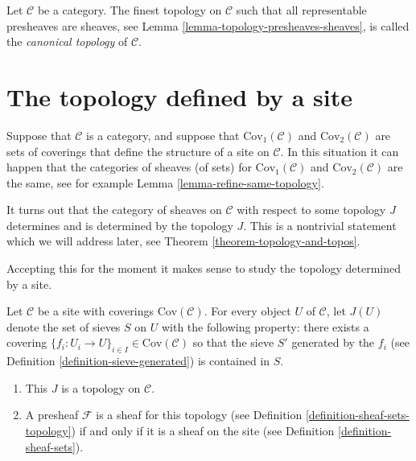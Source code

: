 \begin{definition}
\label{definition-canonical-topology}
Let $\mathcal{C}$ be a category.
The finest topology on $\mathcal{C}$ such that
all representable presheaves are sheaves, see
Lemma \ref{lemma-topology-presheaves-sheaves},
is called the {\it canonical topology} of $\mathcal{C}$.
\end{definition}














\section{The topology defined by a site}
\label{section-topology-site}

\noindent
Suppose that $\mathcal{C}$ is a category, and suppose that
$\text{Cov}_1(\mathcal{C})$ and $\text{Cov}_2(\mathcal{C})$
are sets of coverings that define the structure of a site
on $\mathcal{C}$. In this situation it can happen that
the categories of sheaves (of sets) for $\text{Cov}_1(\mathcal{C})$
and $\text{Cov}_2(\mathcal{C})$ are the same, see for example
Lemma \ref{lemma-refine-same-topology}.

\medskip\noindent
It turns out that the category of sheaves on $\mathcal{C}$
with respect to some topology $J$
determines and is determined by the topology $J$.
This is a nontrivial statement which we will address later,
see Theorem \ref{theorem-topology-and-topos}.

\medskip\noindent
Accepting this for the moment it makes sense to study the
topology determined by a site.

\begin{lemma}
\label{lemma-site-gives-topology}
Let $\mathcal{C}$ be a site with coverings $\text{Cov}(\mathcal{C})$.
For every object $U$ of $\mathcal{C}$, let $J(U)$ denote
the set of sieves $S$ on $U$ with the following property:
there exists a covering
$\{f_i : U_i \to U\}_{i\in I} \in \text{Cov}(\mathcal{C})$
so that the sieve $S'$ generated by the $f_i$ (see Definition
\ref{definition-sieve-generated}) is contained in $S$.
\begin{enumerate}
\item This $J$ is a topology on $\mathcal{C}$.
\item A presheaf $\mathcal{F}$ is a sheaf for this topology
(see Definition \ref{definition-sheaf-sets-topology})
if and only if it is a sheaf on the site (see
Definition \ref{definition-sheaf-sets}).
\end{enumerate}
\end{lemma}

